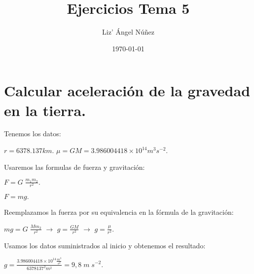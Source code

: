 \documentclass[a4paper,12pt]{article}
\begin{document}
\title{Ejercicios Tema 5}
\author{Liz' Ángel Núñez }
\date{\today} 

\maketitle

\section{Calcular aceleración de la gravedad en la tierra.}
\vspace{\baselineskip}
\begin{justify}
Tenemos los datos:
\end{justify}

    \(r = 6378.137 km.\)\;\;\;\;\;\;\;\;\;\;\;\;\;\; \(\mu   = G M  = 3.986004418 \times 10^{14} m^3 s^{-2}.\)

\vspace{\baselineskip}

\begin{justify}
    Usaremos las formulas de fuerza y gravitación:
\end{justify}
\begin{multicols}{2}
    \(F=G\;\frac{m_1 m_2}{r^2}.\)

    \(F = mg. \)
\end{multicols}
\vspace{\baselineskip}
\begin{justify}
    Reemplazamos la fuerza por su equivalencia en la fórmula de la gravitación:
    \vspace{\baselineskip}

\(mg = G \; \frac{M  m_2}{r^2}\) \(\rightarrow\) \(g =\frac{G M}{r^2} \) \(\rightarrow\) \(g =\frac{\mu }{r^2}.\)
\end{justify}
\vspace{\baselineskip}

\begin{justify}
    Usamos los datos suministrados al inicio y obtenemos el resultado:
\end{justify}
\vspace{\baselineskip}

\begin{center}
    \(g =\frac{3.986004418 \times 10^{14} \frac{m^3}{s^2}}{6378137^2 m^2} = 9,8\; m\;  s^{-2}.\)    
\end{center}
\vspace{\baselineskip}
\end{document}
